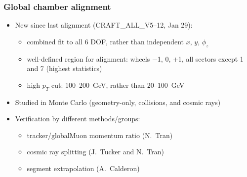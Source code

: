 \documentclass[compress]{beamer}
\begin{document}
\begin{frame}
\frametitle{Global chamber alignment}

\begin{itemize}\setlength{\itemsep}{0.5 cm}
\item New since last alignment (CRAFT\_ALL\_V5--12, Jan 29):
\begin{itemize}\setlength{\itemsep}{0.1 cm}
\item combined fit to all 6 DOF, rather than independent $x$, $y$, $\phi_z$
\item well-defined region for alignment: wheels $-$1, 0, $+$1, all sectors except 1 and 7 (highest statistics)
\item high $p_T$ cut: 100--200~GeV, rather than 20--100~GeV
\end{itemize}
\item Studied in Monte Carlo (geometry-only, collisions, and cosmic rays)
\item Verification by different methods/groups:
\begin{itemize}\setlength{\itemsep}{0.1 cm}
\item tracker/globalMuon momentum ratio \hfill {\scriptsize (N.~Tran)}
\item cosmic ray splitting \hfill {\scriptsize (J.~Tucker and N.~Tran)}
\item segment extrapolation \hfill {\scriptsize (A.~Calderon)}
\end{itemize}
\end{itemize}
\end{frame}
\end{document}
